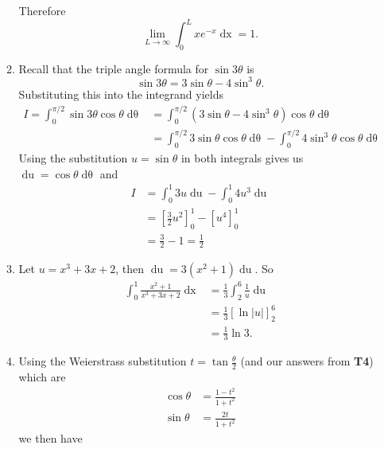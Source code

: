\documentclass[12pt,oneside]{book}
\begin{document}
\begin{enumerate}
\begin{enumerate}
            Therefore \[
                \lim_{L \to \infty} \int_{0}^{L} xe^{-x} \mathop{\mathrm{d}x} = 1 
            .\] 
            \item Recall that the triple angle formula for $\sin 3 \theta$ is \[
                \sin 3\theta = 3 \sin \theta - 4 \sin^3 \theta
            .\] Substituting this into the integrand yields \begin{align*}
                I = \int_{0}^{\pi/2} \sin 3\theta \cos \theta \mathop{\mathrm{d}\theta} &= \int_{0}^{\pi/2} (3 \sin \theta - 4 \sin^3 \theta) \cos \theta \mathop{\mathrm{d}\theta}   \\
                &= \int_{0}^{\pi/2} 3\sin \theta \cos \theta \mathop{\mathrm{d}\theta} - \int_{0}^{\pi/2} 4\sin^3 \theta \cos \theta \mathop{\mathrm{d}\theta}   
            \end{align*}
            Using the substitution $u = \sin \theta$ in both integrals gives us \newline $\mathop{\mathrm{d}u} = \cos \theta \mathop{\mathrm{d}\theta}$ and \begin{align*}
                I &= \int_{0}^{1} 3u \mathop{\mathrm{d}u} - \int_{0}^{1} 4u^3 \mathop{\mathrm{d}u} \\
                &= \left[ \frac{3}{2} u^2 \right]_0^1 - \left[ u^4 \right]_0^1 \\
                &= \frac{3}{2} - 1 = \frac{1}{2}      
            \end{align*}
            \item Let $u = x^3 + 3x + 2$, then $\mathop{\mathrm{d}u} = 3(x^2 + 1) \mathop{\mathrm{d}u}$. So \begin{align*}
                \int_{0}^{1} \frac{x^2 + 1}{x^3 + 3x + 2} \mathop{\mathrm{d}x} &= \frac{1}{3} \int_{2}^{6} \frac{1}{u} \mathop{\mathrm{d}u} \\
                &= \frac{1}{3} \left[ \ln \left| u \right| \right]_2^6 \\
                &= \frac{1}{3} \ln 3.  
            \end{align*} 
            \item Using the Weierstrass substitution $t = \tan \frac{\theta}{2}$ (and our answers from \textbf{T4}) which are \begin{align*}
                \cos \theta &= \frac{1 - t^2}{1 + t^2} \\
                \sin \theta &= \frac{2t}{1+ t^2}
            \end{align*} we then have \begin{align*}

\end{align*}
\end{enumerate}
\end{enumerate}
\end{document}
